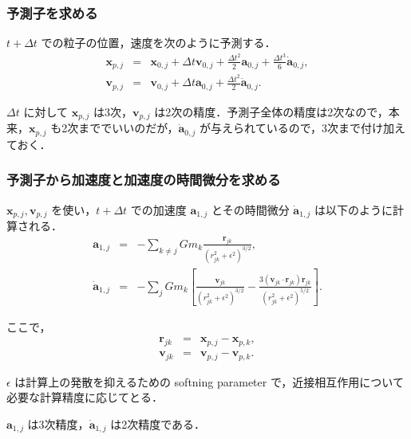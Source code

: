 \documentclass[11pt,a4paper,oneside,onecolumn]{jarticle}
\begin{document}
\subsubsection{予測子を求める \label{sec:predictor}}
$t + \Delta t$ での粒子の位置，速度を次のように予測する．
\begin{eqnarray}
{\bm x}_{p,j} & = & {\bm x}_{0,j} + \Delta t {\bm v}_{0,j} + \frac{\Delta t ^2}{2} {\bm a}_{0,j} + \frac{\Delta t ^3}{6} \dot{{\bm a}}_{0,j}, \\
{\bm v}_{p,j} & = & {\bm v}_{0,j} + \Delta t {\bm a}_{0,j} + \frac{\Delta t ^2}{2} \dot{{\bm a}}_{0,j}. 
\end{eqnarray}

$\Delta t$ に対して ${\bm x}_{p,j}$ は3次，${\bm v}_{p,j}$ は2次の精度．予測子全体の精度は2次なので，本来，${\bm x}_{p,j}$ も2次まででいいのだが，$\dot{{\bm a}}_{0,j}$ が与えられているので，3次まで付け加えておく．

\subsubsection{予測子から加速度と加速度の時間微分を求める}
${\bm x}_{p,j}, {\bm v}_{p,j}$ を使い，$t + \Delta t$ での加速度 ${\bm a}_{1,j}$ とその時間微分 $\dot{{\bm a}}_{1,j}$ は以下のように計算される．
\begin{eqnarray}
{\bm a}_{1,j} & = & - \sum_{k \not= j} G m_k \frac{{\bm r}_{jk}}{(r_{jk}^2 + \epsilon^2)^{3/2}}, \label{eq:a1j}\\
\dot{{\bm a}}_{1,j} & = & - \sum_{j} G m_k \left[ \frac{{\bm v}_{jk}}{(r_{jk}^2 + \epsilon^2)^{3/2}} - \frac{3 ( {\bm v}_{jk} \cdot {\bm r}_{jk} ) {\bm r}_{jk} }{(r_{jk}^2 + \epsilon^2)^{5/2}} \right]. \label{eq:a2j}
\end{eqnarray}

ここで，
\begin{eqnarray}
{\bm r}_{jk} & = & {\bm x}_{p,j} - {\bm x}_{p,k}, \\
{\bm v}_{jk} & = & {\bm v}_{p,j} - {\bm v}_{p,k}. 
\end{eqnarray}

$\epsilon$ は計算上の発散を抑えるための softning parameter で，近接相互作用について必要な計算精度に応じてとる．

${\bm a}_{1,j}$ は3次精度，$\dot{{\bm a}}_{1,j}$ は2次精度である．
\end{document}
